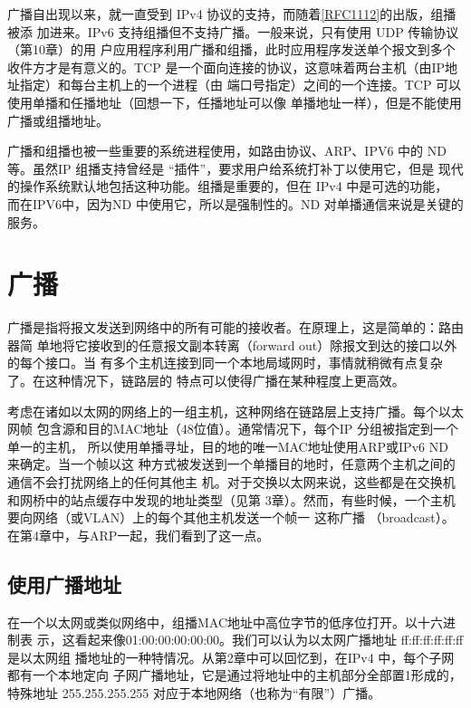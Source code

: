 广播自出现以来，就一直受到 IPv4
协议的支持，而随着\href{https://www.rfc-editor.org/rfc/rfc1112}{[RFC1112]}的出版，组播被添
加进来。IPv6 支持组播但不支持广播。一般来说，只有使用 UDP 传输协议（第10章）的用
户应用程序利用广播和组播，此时应用程序发送单个报文到多个收件方才是有意义的。TCP
是一个面向连接的协议，这意味着两台主机（由IP地址指定）和每台主机上的一个进程（由
端口号指定）之间的一个连接。TCP 可以使用单播和任播地址（回想一下，任播地址可以像
单播地址一样），但是不能使用广播或组播地址。

\begin{tcolorbox}
  广播和组播也被一些重要的系统进程使用，如路由协议、ARP、IPV6 中的
  ND 等。虽然IP 组播支持曾经是 “插件”，要求用户给系统打补丁以使用它，但是
  现代的操作系统默认地包括这种功能。组播是重要的，但在 IPv4 中是可选的功能，
  而在IPV6中，因为ND 中使用它，所以是强制性的。ND 对单播通信来说是关键的
  服务。
\end{tcolorbox}

\section{广播}
广播是指将报文发送到网络中的所有可能的接收者。在原理上，这是简单的：路由器简
单地将它接收到的任意报文副本转离（forward out）除报文到达的接口以外的每个接口。当
有多个主机连接到同一个本地局域网时，事情就稍微有点复杂了。在这种情况下，链路层的
特点可以使得广播在某种程度上更高效。

考虑在诸如以太网的网络上的一组主机，这种网络在链路层上支持广播。每个以太网帧
包含源和目的MAC地址（48位值）。通常情况下，每个IP 分组被指定到一个单一的主机，
所以使用单播寻址，目的地的唯一MAC地址使用ARP或IPv6 ND 来确定。当一个帧以这
种方式被发送到一个单播目的地时，任意两个主机之间的通信不会打扰网络上的任何其他主
机。对于交换以太网来说，这些都是在交换机和网桥中的站点缓存中发现的地址类型（见第
3章）。然而，有些时候，一个主机要向网络（或VLAN）上的每个其他主机发送一个帧一
这称广播 （broadcast）。在第4章中，与ARP一起，我们看到了这一点。

\subsection{使用广播地址}
在一个以太网或类似网络中，组播MAC地址中高位字节的低序位打开。以十六进制表
示，这看起来像01:00:00:00:00:00。我们可以认为以太网广播地址 ff:ff:ff:ff:ff:ff 是以太网组
播地址的一种特情况。从第2章中可以回忆到，在IPv4 中，每个子网都有一个本地定向
子网广播地址，它是通过将地址中的主机部分全部置1形成的，特殊地址 255.255.255.255
对应于本地网络（也称为“有限”）广播。

